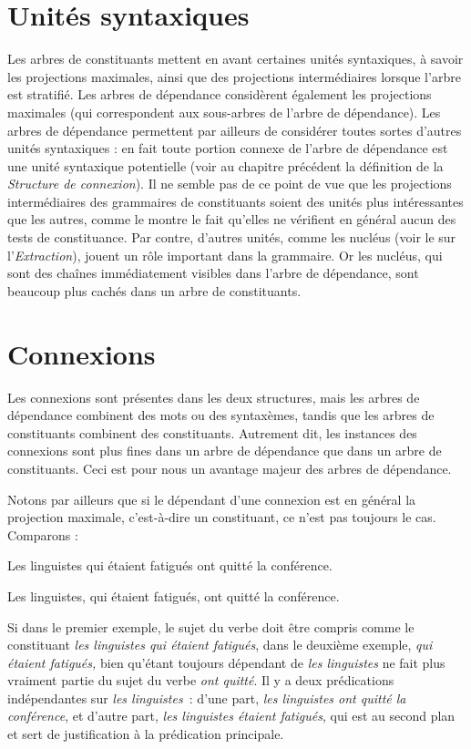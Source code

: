 {    \section*{Unités syntaxiques}

    Les arbres de constituants mettent en avant certaines unités syntaxiques, à savoir les projections maximales, ainsi que des projections intermédiaires lorsque l’arbre est stratifié. Les arbres de dépendance considèrent également les projections maximales (qui correspondent aux sous-arbres de l’arbre de dépendance). Les arbres de dépendance permettent par ailleurs de considérer toutes sortes d’autres unités syntaxiques : en fait toute portion connexe de l’arbre de dépendance est une unité syntaxique potentielle (voir au chapitre précédent la définition de la \textit{Structure de connexion}). Il ne semble pas de ce point de vue que les projections intermédiaires des grammaires de constituants soient des unités plus intéressantes que les autres, comme le montre le fait qu’elles ne vérifient en général aucun des tests de constituance. Par contre, d’autres unités, comme les nucléus (voir le  sur l’\textit{Extraction}), jouent un rôle important dans la grammaire. Or les nucléus, qui sont des chaînes immédiatement visibles dans l’arbre de dépendance, sont beaucoup plus cachés dans un arbre de constituants.

    \section*{Connexions}

    Les connexions sont présentes dans les deux structures, mais les arbres de dépendance combinent des mots ou des syntaxèmes, tandis que les arbres de constituants combinent des constituants. Autrement dit, les instances des connexions sont plus fines dans un arbre de dépendance que dans un arbre de constituants. Ceci est pour nous un avantage majeur des arbres de dépendance.

    Notons par ailleurs que si le dépendant d’une connexion est en général la projection maximale, c’est-à-dire un constituant, ce n’est pas toujours le cas. Comparons :

    \ea
    {Les linguistes qui étaient fatigués ont quitté la conférence.}
    \z

    \ea
    Les linguistes, qui étaient fatigués, ont quitté la conférence.
    \z

    Si dans le premier exemple, le sujet du verbe doit être compris comme le constituant \textit{les linguistes qui étaient fatigués}, dans le deuxième exemple, \textit{qui étaient fatigués,} bien qu’étant toujours dépendant de \textit{les linguistes} ne fait plus vraiment partie du sujet du verbe \textit{ont quitté}. Il y a deux prédications indépendantes sur \textit{les linguistes~}: d’une part, \textit{les linguistes ont quitté la conférence}, et d’autre part, \textit{les linguistes étaient fatigués}, qui est au second plan et sert de justification à la prédication principale.

}
